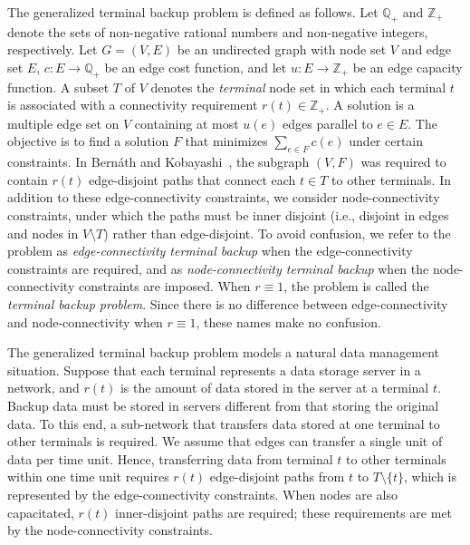 \documentclass{article}
\newcommand{\Zset}{\mathbb{Z}}
\newcommand{\Rset}{\mathbb{Q}}
\begin{document}
The generalized terminal backup problem is defined as follows. 
Let $\Rset_+$ and $\Zset_+$ 
denote the sets of non-negative rational numbers and non-negative integers, 
respectively. 
Let $G=(V,E)$ be an undirected graph
with node set $V$ and edge set $E$, 
$c\colon E \rightarrow
\Rset_+$ be an edge cost function,
and let $u\colon E \rightarrow \Zset_+$ be an edge capacity function.
A subset $T$ of $V$ denotes the \emph{terminal} node set in which
each terminal $t$ is associated with a connectivity requirement
$r(t)\in \Zset_+$.
A solution is a multiple edge set on $V$ containing at most $u(e)$ edges parallel 
to $e \in E$. The objective is to find a solution
$F$ that minimizes $\sum_{e \in F} c(e)$ under certain constraints.
In Bern{\'a}th and Kobayashi~\cite{Bernath2014}, 
the subgraph $(V,F)$ was required to contain $r(t)$ 
edge-disjoint paths that connect each $t \in T$ to other terminals.
In addition to these edge-connectivity constraints, we consider
node-connectivity constraints, under which the paths must be 
inner disjoint (i.e., disjoint in edges and nodes in $V\setminus T$) rather than edge-disjoint.
To avoid confusion,
we refer to the problem as \emph{edge-connectivity terminal backup} 
when the edge-connectivity constraints are required, and
as \emph{node-connectivity terminal backup}
when the node-connectivity constraints are imposed.
When $r \equiv 1$, the problem is called the \emph{terminal backup problem}.
Since there is no difference between edge-connectivity and node-connectivity
when $r\equiv 1$, these names make no confusion.

The generalized terminal backup problem 
models a natural data management situation. Suppose that each terminal represents a data storage server
in a network, and $r(t)$ is the amount of data stored in the server at a terminal $t$.
Backup data must be stored in servers different from that storing the original data.
To this end, 
a sub-network that transfers data stored at one terminal to other terminals is required. 
We assume that 
edges can transfer a single unit of data per time unit.
Hence, transferring data from terminal $t$ to other terminals within one time unit
requires $r(t)$ edge-disjoint paths from $t$ 
to $T\setminus \{t\}$, which is represented by the edge-connectivity constraints. 
When nodes are also capacitated, $r(t)$ 
inner-disjoint paths are required; these requirements are met by the node-connectivity
constraints.
\end{document}
